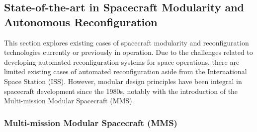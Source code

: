 \subsection{State-of-the-art in Spacecraft Modularity and Autonomous Reconfiguration}
This section explores existing cases of spacecraft modularity and reconfiguration technologies currently or previously in operation. Due to the challenges related to developing automated reconfiguration systems for space operations, there are limited existing cases of automated reconfiguration aside from the International Space Station (ISS). However, modular design principles have been integral in spacecraft development since the 1980s, notably with the introduction of the Multi-mission Modular Spacecraft (MMS).

\subsubsection{Multi-mission Modular Spacecraft (MMS)}

